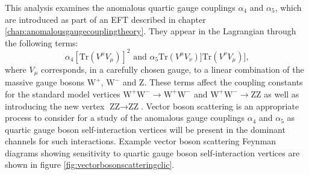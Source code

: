 This analysis examines the anomalous quartic gauge couplings $\alpha_{4}$ and $\alpha_{5}$, which are introduced as part of an EFT described in chapter \ref{chap:anomalousgaugecouplingtheory}.  They appear in the Lagrangian through the following terms:
%
\begin{equation}
\alpha_{4}[\text{Tr}(V^{\mu}V_{\mu})]^{2} \text{ and } \alpha_{5}\text{Tr}(V^{\mu}V_{\nu})] \text{Tr}(V^{\nu}V_{\mu})]\text{,}
\end{equation}
%
\noindent where $V_{\mu}$ corresponds, in a carefully chosen gauge, to a linear combination of the massive gauge bosons $\text{W}^{+}$, $\text{W}^{-}$ and Z.  These terms affect the coupling constants for the standard model vertices $\text{W}^{+}\text{W}^{-} \rightarrow \text{W}^{+}\text{W}^{-}$ and $\text{W}^{+}\text{W}^{-} \rightarrow \text{Z}\text{Z}$ as well as introducing the new vertex $\text{Z}\text{Z} \rightarrow \text{Z}\text{Z}$.  Vector boson scattering is an appropriate process to consider for a study of the anomalous gauge couplings $\alpha_{4}$ and $\alpha_{5}$ as quartic gauge boson self-interaction vertices will be present in the dominant channels for such interactions.  Example vector boson scattering Feynman diagrams showing sensitivity to quartic gauge boson self-interaction vertices are shown in figure \ref{fig:vectorbosonscatteringclic}. 

